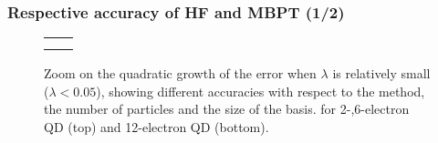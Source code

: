 \documentclass[xcolor=pdftex,hyperref={pdfpagelabels=false},table]{beamer}
\begin{document}
\begin{frame}
\frametitle{Respective accuracy of HF and MBPT (1/2)}
\begin{figure}
\begin{tabular}{cc}
	\scalebox{0.32}{} & 	\scalebox{0.32}{}  \\
	\scalebox{0.32}{}  & \\
\end{tabular}
	\vspace{-5pt}
	\caption{Zoom on the quadratic growth of the error when $\lambda$ is relatively small ($\lambda < 0.05$), showing different accuracies with respect to the method, the number of particles and the size of the basis. for 2-,6-electron QD (top) and 12-electron QD (bottom).}
\end{figure}
\end{frame}
\end{document}
